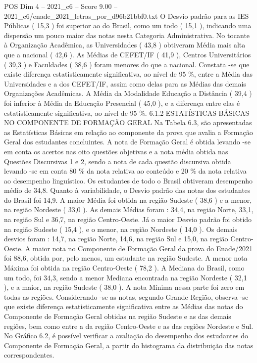 \begin{textsample}{POS Dim 4 – 2021\_c6 – Score 9.00 – 2021\_c6/enade\_2021\_letras\_por\_d96b21bbf0.txt}
O Desvio padrão para as IES Públicas ( 15,3 ) foi superior ao do Brasil, como um todo ( 15,1 ), indicando uma dispersão um pouco maior das notas nesta Categoria Administrativa.
No tocante à Organização Acadêmica, as Universidades ( 43,8 ) obtiveram Média mais alta que a nacional ( 42,6 ).
As Médias de CEFET/IF ( 41,9 ), Centros Universitários ( 39,3 ) e Faculdades ( 38,6 ) foram menores do que a nacional.
Constata -se que existe diferença estatisticamente significativa, ao nível de 95 \%, entre a Média das Universidades e a dos CEFET/IF, assim como delas para as Médias das demais Organizações Acadêmicas.
A Média da Modalidade Educação a Distância ( 39,4 ) foi inferior à Média da Educação Presencial ( 45,0 ), e a diferença entre elas é estatisticamente significativa, ao nível de 95 \%. 6.1.2 ESTATÍSTICAS BÁSICAS NO COMPONENTE DE FORMAÇÃO GERAL Na Tabela 6.3, são apresentadas as Estatísticas Básicas em relação ao componente da prova que avalia a Formação Geral dos estudantes concluintes.
A nota de Formação Geral é obtida levando -se em conta os acertos nas oito questões objetivas e a nota média obtida nas Questões Discursivas 1 e 2, sendo a nota de cada questão discursiva obtida levando -se em conta 80 \% da nota relativa ao conteúdo e 20 \% da nota relativa ao desempenho linguístico.
Os estudantes de todo o Brasil obtiveram desempenho médio de 34,8.
Quanto à variabilidade, o Desvio padrão das notas dos estudantes do Brasil foi 14,9.
A maior Média foi obtida na região Sudeste ( 38,6 ) e a menor, na região Nordeste ( 33,0 ).
As demais Médias foram : 34,4, na região Norte, 33,1, na região Sul e 36,7, na região Centro-Oeste.
Já o maior Desvio padrão foi obtido na região Sudeste ( 15,4 ), e o menor, na região Nordeste ( 14,0 ).
Os demais desvios foram : 14,7, na região Norte, 14,6, na região Sul e 15,0, na região Centro-Oeste.
A maior nota no Componente de Formação Geral da prova do Enade/2021 foi 88,6, obtida por, pelo menos, um estudante na região Sudeste.
A menor nota Máxima foi obtida na região Centro-Oeste ( 78,2 ).
A Mediana do Brasil, como um todo, foi 34,3, sendo a menor Mediana encontrada na região Nordeste ( 32,1 ), e a maior, na região Sudeste ( 38,0 ).
A nota Mínima nessa parte foi zero em todas as regiões.
Considerando -se as notas, segundo Grande Região, observa -se que existe diferença estatisticamente significativa entre as Médias das notas do Componente de Formação Geral obtidas na região Sudeste e as das demais regiões, bem como entre a da região Centro-Oeste e as das regiões Nordeste e Sul.
No Gráfico 6.2, é possível verificar a avaliação do desempenho dos estudantes do Componente de Formação Geral, a partir do histograma da distribuição das notas correspondentes.

\end{textsample}
